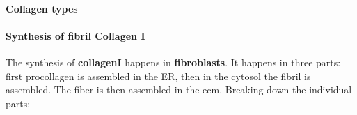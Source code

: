\documentclass[../main.tex]{subfiles}
\begin{document}
\paragraph{Collagen types}
\begin{figure}[H]
	\centering
\end{figure}


\paragraph{Synthesis of fibril Collagen I}

The synthesis of \textbf{\gls{collagenI}} happens in \textbf{\gls{fibroblasts}}. It happens in three parts: first \gls{procollagen} is assembled in the ER, then in the cytosol the fibril is assembled. The fiber is then assembled in the ecm. Breaking down the individual parts: \\
\end{document}
